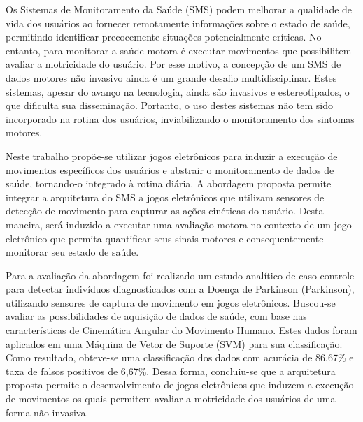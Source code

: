 Os Sistemas de Monitoramento da Saúde (SMS) podem melhorar a qualidade de vida dos usuários ao fornecer remotamente informações sobre o estado de saúde, permitindo identificar precocemente situações potencialmente críticas. No entanto, para monitorar a saúde motora é executar movimentos que possibilitem avaliar a motricidade do usuário. Por esse motivo, a concepção de um SMS de dados motores não invasivo ainda é um grande desafio multidisciplinar. Estes sistemas, apesar do avanço na tecnologia, ainda são invasivos e estereotipados, o que dificulta sua disseminação. Portanto, o uso destes sistemas não tem sido incorporado na rotina dos usuários, inviabilizando o monitoramento dos sintomas motores. 

Neste trabalho propõe-se utilizar jogos eletrônicos para induzir a execução de movimentos específicos dos usuários e abstrair o monitoramento de dados de saúde, tornando-o integrado à rotina diária. A abordagem proposta permite integrar a arquitetura do SMS a jogos eletrônicos que utilizam sensores de detecção de movimento para capturar as ações cinéticas do usuário. Desta maneira, será induzido a executar uma avaliação motora no contexto de um jogo eletrônico que permita quantificar seus sinais motores e consequentemente monitorar seu estado de saúde.

Para a avaliação da abordagem foi realizado um estudo analítico de caso-controle para detectar indivíduos diagnosticados com a Doença de Parkinson (Parkinson), utilizando sensores de captura de movimento em jogos eletrônicos. Buscou-se avaliar as possibilidades de aquisição de dados de saúde, com base nas características de Cinemática Angular do Movimento Humano. Estes dados foram aplicados em uma Máquina de Vetor de Suporte (SVM) para sua classificação. Como resultado, obteve-se uma classificação dos dados com acurácia de 86,67\% e taxa de falsos positivos de 6,67\%. Dessa forma, concluiu-se que a arquitetura proposta permite o desenvolvimento de jogos eletrônicos que induzem a execução de movimentos os quais permitem avaliar a motricidade dos usuários de uma forma não invasiva.



